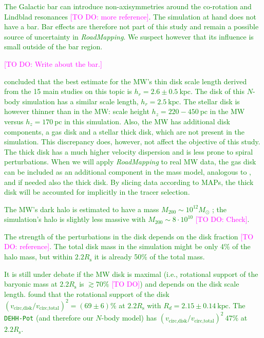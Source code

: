 \documentclass[iop,revtex4,numberedappendix,appendixfloats]{emulateapj}
\newcommand{\RM}{{\sl RoadMapping}}
\newcommand{\Wilma}[1]{\textcolor{Magenta}{#1}}
\newcommand{\NEW}[1]{\textcolor{Green}{#1}}
\begin{document}
\NEW{The Galactic bar can introduce non-axisymmetries around the co-rotation and Lindblad resonances \citep{2000AJ....119..800D} \Wilma{[TO DO:  more reference]}. The simulation at hand does not have a bar. Bar effects are therefore not part of this study and remain a possible source of uncertainty  in \RM{}. We suspect however that its influence is small outside of the bar region.}

\Wilma{[TO DO: Write about the bar.]}

\NEW{\citet{2016ARA&A..54..529B} concluded that the best estimate for the MW's thin disk scale length derived from the 15 main studies on this topic  is $h_r = 2.6 \pm 0.5~\text{kpc}$. The disk of this $N$-body simulation has a similar scale length, $h_r = 2.5~\text{kpc}$. The stellar disk is however thinner than in the MW: scale height $h_z=220-450~\text{pc}$ in the MW \citep{2016ARA&A..54..529B} versus $h_z=170~\text{pc}$ in this simulation. Also, the MW has additional disk components, a gas disk and a stellar thick disk, which are not present in the simulation. This discrepancy does, however, not affect the objective of this study. The thick disk has a much higher velocity dispersion and is less prone to spiral perturbations. When we will apply \RM{} to real MW data, the gas disk can be included as an additional component in the mass model, analogous to \citet{2013ApJ...779..115B}, and if needed also the thick disk. By slicing data according to MAPs, the thick disk will be accounted for implicitly in the tracer selection.}

\NEW{The MW's dark halo is estimated to have a mass $M_{200}\sim10^{12}M_\odot$ \citep{2016ARA&A..54..529B}; the simulation's halo is slightly less massive with $M_{200}\sim8\cdot10^{10}$ \Wilma{[TO DO: Check]}.}

\NEW{The strength of the perturbations in the disk depends on the disk fraction \Wilma{[TO DO: reference]}. The total disk mass in the simulation might be only 4\% of the halo mass, but within $2.2R_\text{s}$ it is already 50\% of the total mass.}

\NEW{It is still under debate if the MW disk is maximal (i.e., rotational support of the baryonic mass at $2.2R_\text{s}$ is $\gtrsim70\%$ \Wilma{[TO DO]}) and depends on the disk scale length. \citet{2013ApJ...779..115B} found that the rotational support of the disk $\left( v_\text{circ,disk}/v_\text{circ,total}\right)^2=(69\pm6)\%$ at $2.2R_\text{s}$ with $R_d=2.15\pm0.14~\text{kpc}$. The \texttt{DEHH-Pot} (and therefore our $N$-body model) has  $\left( v_\text{circ,disk}/v_\text{circ,total}\right)^2~47\%$ at $2.2R_\text{s}$.}
\end{document}
